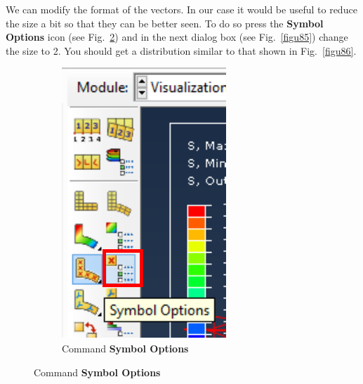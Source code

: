 \begin{enumerate}
  We can modify the format of the vectors. In our case it would be
  useful to reduce the size a bit so that they can be  better seen. To
  do so press the \textbf{Symbol Options} icon (see Fig.~\ref{figu84})
  and in the next dialog box (see Fig.~\ref{figu85}) change the size
  to 2. You should get a distribution similar to that shown in
  Fig.~\ref{figu86}.
  \begin{figure}[H]
    \centering
    \begin{subfigure}{0.19\textwidth}
      \includegraphics[width=\textwidth]{./body/images/imagen84}
      \caption{Command \textbf{Symbol Options}}
      \label{figu84}

\end{subfigure}
\end{figure}
\end{enumerate}
